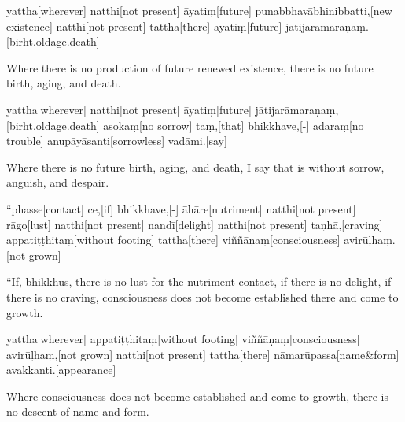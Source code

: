 \begin{samepage}
\begingl[glneveryline={\PaliGlossA,\PaliGlossB}]
yattha[wherever] natthi[not present] āyatiṃ[future] punabbhavābhinibbatti,[new existence] natthi[not present] tattha[there] āyatiṃ[future] jātijarāmaraṇaṃ.[birht.oldage.death]
\endgl
\nopagebreak
\linespread{0.5}
\begin{spacin}{0.2}
{\PaliGlossFT Where there is no production of future renewed existence, there is no future birth, aging, and death.}
\end{spacin}
\vskip 12pt
\end{samepage}
\begin{samepage}
\begingl[glneveryline={\PaliGlossA,\PaliGlossB}]
yattha[wherever] natthi[not present] āyatiṃ[future] jātijarāmaraṇaṃ,[birht.oldage.death] asokaṃ[no sorrow] taṃ,[that] bhikkhave,[-] adaraṃ[no trouble] anupāyāsanti[sorrowless] vadāmi.[say]
\endgl
\nopagebreak
\linespread{0.5}
\begin{spacin}{0.2}
{\PaliGlossFT Where there is no future birth, aging, and death, I say that is without sorrow, anguish, and despair.}
\end{spacin}
\vskip 12pt
\end{samepage}
\vskip 0.2in
\begin{samepage}
\begingl[glneveryline={\PaliGlossA,\PaliGlossB}]
“phasse[contact] ce,[if] bhikkhave,[-] āhāre[nutriment] natthi[not present] rāgo[lust] natthi[not present] nandī[delight] natthi[not present] taṇhā,[craving] appatiṭṭhitaṃ[without footing] tattha[there] viññāṇaṃ[consciousness] avirūḷhaṃ.[not grown]
\endgl
\nopagebreak
\linespread{0.5}
\begin{spacin}{0.2}
{\PaliGlossFT “If, bhikkhus, there is no lust for the nutriment contact, if there is no delight, if there is no craving, consciousness does not become established there and come to growth.}
\end{spacin}
\vskip 12pt
\end{samepage}
\begin{samepage}
\begingl[glneveryline={\PaliGlossA,\PaliGlossB}]
yattha[wherever] appatiṭṭhitaṃ[without footing] viññāṇaṃ[consciousness] avirūḷhaṃ,[not grown] natthi[not present] tattha[there] nāmarūpassa[name\&form] avakkanti.[appearance]
\endgl
\nopagebreak
\linespread{0.5}
\begin{spacin}{0.2}
{\PaliGlossFT Where consciousness does not become established and come to growth, there is no descent of name-and-form.}
\end{spacin}
\vskip 12pt
\end{samepage}
